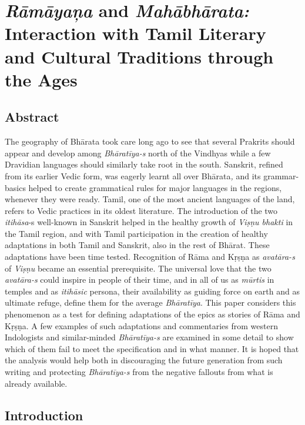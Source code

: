 
\chapter{\textit{Rāmāyaņa} and \textit{Mahābhārata:} Interaction with Tamil Literary and Cultural Traditions through the Ages}\label{intro}



\section*{Abstract}

The geography of Bhārata took care long ago to see that several Prakrits should appear and develop among \textit{Bhāratīya-s} north of the Vindhyas while a few Dravidian languages should similarly take root in the south. Sanskrit, refined from its earlier Vedic form, was eagerly learnt all over Bhārata\textit{,} and its grammar-basics helped to create grammatical rules for major languages in the regions, whenever they were ready. Tamil, one of the most ancient languages of the land, refers to Vedic practices in its oldest literature. The introduction of the two \textit{itihāsa}-s well-known in Sanskrit helped in the healthy growth of \textit{Viṣṇu bhakti} in the Tamil region, and with Tamil participation in the creation of healthy adaptations in both Tamil and Sanskrit, also in the rest of Bhārat. These adaptations have been time tested. Recognition of Rāma and Kṛṣṇa as \textit{avatāra-s} of \textit{Viṣṇu} became an essential prerequisite. The universal love that the two \textit{avatāra-s} could inspire in people of their time, and in all of us as \textit{mūrtis} in temples and as \textit{itihāsic} persona, their availability as guiding force on earth and as ultimate refuge, define them for the average \textit{Bhāratīya}. This paper considers this phenomenon as a test for defining adaptations of the epics as stories of Rāma and Kṛṣṇa. A few examples of such adaptations and commentaries from western Indologists and similar-minded \textit{Bhāratīya-s} are examined in some detail to show which of them fail to meet the specification and in what manner. It is hoped that the analysis would help both in discouraging the future generation from such writing and protecting \textit{Bhāratīya-s} from the negative fallouts from what is already available.


\section*{Introduction}

